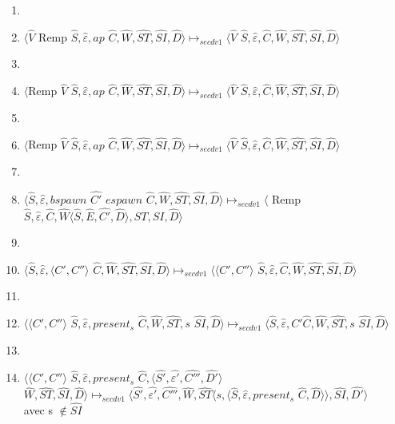 \documentclass[10pt,a4paper]{article}
\begin{document}
\begin{enumerate}
					\item[]
					\item $\langle\widehat{V}$ Remp $\widehat{S},\widehat{\varepsilon},ap$ $\widehat{C},\widehat{W},\widehat{ST},\widehat{SI},\widehat{D}\rangle \longmapsto_{secdv1} \langle \widehat{V}$ $\widehat{S},\widehat{\varepsilon},\widehat{C},\widehat{W},\widehat{ST},\widehat{SI},\widehat{D}\rangle$
					\item[]
					\item $\langle$Remp $\widehat{V}$ $\widehat{S},\widehat{\varepsilon},ap$ $\widehat{C},\widehat{W},\widehat{ST},\widehat{SI},\widehat{D}\rangle \longmapsto_{secdv1} \langle \widehat{V}$ $\widehat{S},\widehat{\varepsilon},\widehat{C},\widehat{W},\widehat{ST},\widehat{SI},\widehat{D}\rangle$
					\item[]
					\item $\langle$Remp $\widehat{V}$ $\widehat{S},\widehat{\varepsilon},ap$ $\widehat{C},\widehat{W},\widehat{ST},\widehat{SI},\widehat{D}\rangle \longmapsto_{secdv1} \langle \widehat{V}$ $\widehat{S},\widehat{\varepsilon},\widehat{C},\widehat{W},\widehat{ST},\widehat{SI},\widehat{D}\rangle$
					\item[]
					\item $\langle\widehat{S},\widehat{\varepsilon},bspawn$ $\widehat{C'}$ $espawn$ $\widehat{C},\widehat{W},\widehat{ST},\widehat{SI},\widehat{D}\rangle \longmapsto_{secdv1} \langle$ Remp $\widehat{S},\widehat{\varepsilon},\widehat{C},\widehat{W}\langle\widehat{S},\widehat{E},\widehat{C'},\widehat{D}\rangle,\widehat{ST},\widehat{SI},\widehat{D}\rangle$
					\item[]
					\item $\langle\widehat{S},\widehat{\varepsilon},\langle C',C''\rangle$ $\widehat{C},\widehat{W},\widehat{ST},\widehat{SI},\widehat{D}\rangle \longmapsto_{secdv1} \langle\langle C',C''\rangle$ $\widehat{S},\widehat{\varepsilon},\widehat{C},\widehat{W},\widehat{ST},\widehat{SI},\widehat{D}\rangle$
					\item[]
					\item $\langle\langle C',C''\rangle $ $\widehat{S},\widehat{\varepsilon},present_{s}$ $\widehat{C},\widehat{W},\widehat{ST},s$ $\widehat{SI},\widehat{D}\rangle \longmapsto_{secdv1} \langle\widehat{S},\widehat{\varepsilon},C'\widehat{C},\widehat{W},\widehat{ST},s$ $\widehat{SI},\widehat{D}\rangle$
					\item[]
					\item $\langle\langle C',C''\rangle $ $\widehat{S},\widehat{\varepsilon},present_{s}$ $\widehat{C},\langle\widehat{S'},\widehat{\varepsilon'},\widehat{C'''},\widehat{D'}\rangle$ $\widehat{W},\widehat{ST},\widehat{SI},\widehat{D}\rangle \longmapsto_{secdv1} \langle\widehat{S'},\widehat{\varepsilon'},\widehat{C'''},\widehat{W},\widehat{ST}\langle s,\langle\widehat{S},\widehat{\varepsilon},present_{s}$ $\widehat{C},\widehat{D}\rangle\rangle,\widehat{SI},\widehat{D'}\rangle$ \\avec s $\notin \widehat{SI}$ 

\end{enumerate}
\end{document}
